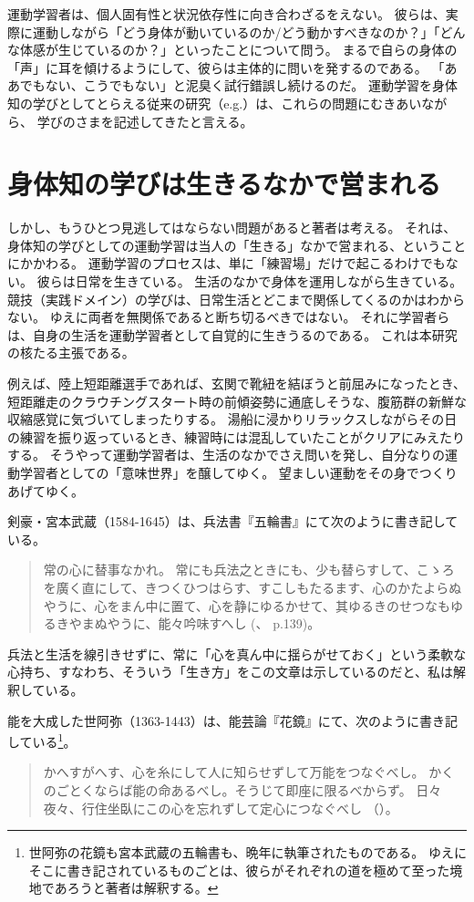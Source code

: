 運動学習者は、個人固有性と状況依存性に向き合わざるをえない。
彼らは、実際に運動しながら「どう身体が動いているのか/どう動かすべきなのか？」「どんな体感が生じているのか？」といったことについて問う。
まるで自らの身体の「声」に耳を傾けるようにして、彼らは主体的に問いを発するのである。
「ああでもない、こうでもない」と泥臭く試行錯誤し続けるのだ。
運動学習を身体知の学びとしてとらえる従来の研究（e.g.\cite{suwa:2016}）は、これらの問題にむきあいながら、
学びのさまを記述してきたと言える。

\section{身体知の学びは生きるなかで営まれる}
\label{sec:konzenittai}
しかし、もうひとつ見逃してはならない問題があると著者は考える。
それは、身体知の学びとしての運動学習は当人の「生きる」なかで営まれる、ということにかかわる。
運動学習のプロセスは、単に「練習場」だけで起こるわけでもない。
彼らは日常を生きている。
生活のなかで身体を運用しながら生きている。
競技（実践ドメイン）の学びは、日常生活とどこまで関係してくるのかはわからない。
ゆえに両者を無関係であると断ち切るべきではない。
それに学習者らは、自身の生活を運動学習者として自覚的に生きうるのである。
これは本研究の核たる主張である。

例えば、陸上短距離選手であれば、玄関で靴紐を結ぼうと前屈みになったとき、短距離走のクラウチングスタート時の前傾姿勢に通底しそうな、腹筋群の新鮮な収縮感覚に気づいてしまったりする。
湯船に浸かりリラックスしながらその日の練習を振り返っているとき、練習時には混乱していたことがクリアにみえたりする。
そうやって運動学習者は、生活のなかでさえ問いを発し、自分なりの運動学習者としての「意味世界」を醸してゆく。
望ましい運動をその身でつくりあげてゆく。

剣豪・宮本武蔵（1584-1645）は、兵法書『五輪書』\cite{miyamoto}にて次のように書き記している。
\begin{quote}
  常の心に替事なかれ。
  常にも兵法之ときにも、少も替らすして、こゝろを廣く直にして、きつくひつはらす、すこしもたるます、心のかたよらぬやうに、心をまん中に置て、心を静にゆるかせて、其ゆるきのせつなもゆるきやまぬやうに、能々吟味すへし
  (\cite{miyamoto}、 p.139)。
\end{quote}
兵法と生活を線引きせずに、常に「心を真ん中に揺らがせておく」という柔軟な心持ち、すなわち、そういう「生き方」をこの文章は示しているのだと、私は解釈している。

能を大成した世阿弥（1363-1443）は、能芸論『花鏡』\cite{zeami}にて、次のように書き記している\footnote{
  世阿弥の花鏡も宮本武蔵の五輪書も、晩年に執筆されたものである。
  ゆえにそこに書き記されているものごとは、彼らがそれぞれの道を極めて至った境地であろうと著者は解釈する。
}。
\begin{quote}
かへすがへす、心を糸にして人に知らせずして万能をつなぐべし。
かくのごとくならば能の命あるべし。そうじて即座に限るべからず。
日々夜々、行住坐臥にこの心を忘れずして定心につなぐべし
（\cite{zeami}）。
\end{quote}


